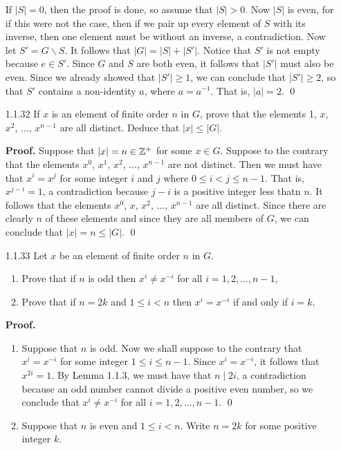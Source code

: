 \begin{enumerate}
      If $|S| = 0$, then the proof is done, so assume that $|S| > 0$. Now $|S|$ 
      is even, for if this were not the case, then if we pair up every element
      of $S$ with its inverse, then one element must be without an inverse, a 
      contradiction. Now let $S' = G\backslash S$. It follows that
      $|G| = |S| + |S'|$. Notice that $S'$ is not empty because $e \in S'$. 
      Since $G$ and $S$ are both even, it follows that $|S'|$ must also be even. 
      Since we already showed that $|S'| \ge 1$, we can conclude that
      $|S'| \ge 2$, so that $S'$ contains a non-identity $a$, where
      $a = a^{-1}$. That is, $|a| = 2$. \qed
   \item[1.1.32]  If $x$ is an element of finite order $n$ in $G$, prove that
                  the elements 1, $x$, $x^2$, $\ldots$, $x^{n-1}$ are all 
                  distinct. Deduce that $|x| \le |G|$.

      \textbf{Proof.} Suppose that $|x| = n \in \mathbb{Z}^+$ for some $x \in G$. 
      Suppose to the contrary that the elements $x^0$, $x^1$, $x^2$, $\ldots$, 
      $x^{n-1}$ are not distinct. Then we must have that $x^i = x^j$ for some
      integer $i$ and $j$ where $0 \le i < j \le n - 1$. That is, $x^{j-i} = 1$,
      a contradiction because $j - i$ is a positive integer less thatn $n$. It
      follows that the elements $x^0$, $x$, $x^2$, $\ldots$, $x^{n-1}$ are all 
      distinct. Since there are clearly $n$ of these elements and since they are
      all members of $G$, we can conclude that $|x| = n \le |G|$. \qed
   \item[1.1.33]  Let $x$ be an element of finite order $n$ in $G$.
                  \begin{enumerate}
                     \item Prove that if $n$ is odd then $x^i \neq x^{-i}$ for
                           all $i = 1, 2, \ldots, n - 1$,
                     \item Prove that if $n = 2k$ and $1 \le i < n$ then
                           $x^i = x^{-i}$ if and only if $i = k$.
                  \end{enumerate}

      \textbf{Proof.}

      \begin{enumerate}
         \item Suppose that $n$ is odd. Now we shall suppose to the contrary
               that $x^i = x^{-i}$ for some integer $1 \le i \le n - 1$. Since
               $x^i = x^{-i}$, it follows that $x^{2i} = 1$. By Lemma 1.1.3, we
               must have that $n \mid 2i$, a contradiction because an odd
               number cannot divide a positive even number, so we conclude that
               $x^i \neq x^{-i}$ for all $i = 1, 2, \ldots, n - 1$. \qed
         \item Suppose that $n$ is even and $1 \le i < n$. Write $n = 2k$ for
               some positive integer $k$.


\end{enumerate}
\end{enumerate}
